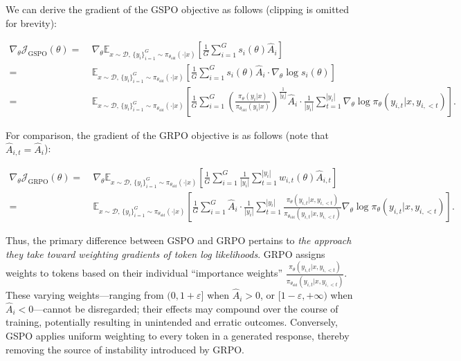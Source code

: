 We can derive the gradient of the GSPO objective as follows (clipping is omitted for brevity):

\begin{align}
\nabla_{\theta} \mathcal{J}_\text{GSPO} (\theta)
=&\ 
\nabla_{\theta} \mathbb{E}_{ x \sim \mathcal{D},\, \{y_i\}_{i=1}^G \sim \pi_{\theta_\text{old}}( \cdot | x) }
\left[ 
\frac{1}{G} \sum_{i=1}^{G} s_{i}(\theta) \widehat{A}_{i}
\right] \\
= &\ 
\mathbb{E}_{ x \sim \mathcal{D},\, \{y_i\}_{i=1}^G \sim \pi_{\theta_\text{old}}( \cdot | x) }
\left[ 
\frac{1}{G} \sum_{i=1}^{G}
s_{i}(\theta) \widehat{A}_{i}
\cdot \nabla_{\theta} \log s_{i}(\theta)
\right] \\
=&\ 
\mathbb{E}_{ x \sim \mathcal{D},\, \{y_i\}_{i=1}^G \sim \pi_{\theta_\text{old}}( \cdot | x) }
\left[ 
\frac{1}{G} \sum_{i=1}^{G} 
\left( \frac{ \pi_{\theta} (y_i | x) }{ \pi_{\theta_\text{old}} (y_i | x)} \right)^{\frac{1}{|y_i|}} \widehat{A}_{i} 
\cdot \frac{1}{|y_i|} \sum_{t=1}^{|y_i|} \nabla_{\theta} \log \pi_{\theta} (y_{i,t} | x, y_{i,<t}) 
\right].
\label{equ:gspo_grad}
\end{align}

For comparison, the gradient of the GRPO objective is as follows (note that $\widehat{A}_{i,t} = \widehat{A}_{i}$):

\begin{align}
\nabla_{\theta} \mathcal{J}_\text{GRPO} (\theta) 
=&\ 
\nabla_{\theta} \mathbb{E}_{ x \sim \mathcal{D},\, \{y_i\}_{i=1}^G \sim \pi_{\theta_\text{old}}( \cdot | x) }
\left[ \frac{1}{G} \sum_{i=1}^{G} \frac{1}{|y_i|} \sum_{t=1}^{|y_i|} 
w_{i,t}(\theta) \widehat{A}_{i,t}
\right] \\
=&\
\mathbb{E}_{ x \sim \mathcal{D},\, \{y_i\}_{i=1}^G \sim \pi_{\theta_\text{old}}( \cdot | x) }
\left[ \frac{1}{G} \sum_{i=1}^{G} \widehat{A}_{i} 
\cdot \frac{1}{|y_i|} \sum_{t=1}^{|y_i|} 
\frac{ \pi_{\theta} (y_{i,t} | x, y_{i,<t}) }{ \pi_{\theta_\text{old}} (y_{i,t} | x,y_{i,<t})} 
\nabla_{\theta} \log \pi_{\theta} (y_{i,t} | x, y_{i,<t})  
\right].
\end{align}

Thus, the primary difference between GSPO and GRPO pertains to \textit{the approach they take toward weighting gradients of token log likelihoods}. GRPO assigns weights to tokens based on their individual ``importance weights'' $\frac{ \pi_{\theta} (y_{i,t} | x, y_{i,<t}) }{ \pi_{\theta_\text{old}} (y_{i,t} | x,y_{i,<t})}$. These varying weights—ranging from $(0, 1+\varepsilon]$ when $\widehat{A}_{i} >0$, or $[1-\varepsilon, +\infty)$ when $\widehat{A}_{i} < 0$—cannot be disregarded; their effects may compound over the course of training, potentially resulting in unintended and erratic outcomes. Conversely, GSPO applies uniform weighting to every token in a generated response, thereby removing the source of instability introduced by GRPO.

